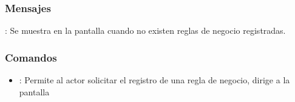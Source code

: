 \subsubsection{Mensajes}

\begin{Citemize}
	\item {}: Se muestra en la pantalla  cuando no existen reglas de negocio registradas.
\end{Citemize}

\label{IU9A}
\subsubsection{Comandos}
\begin{itemize}
	\item {}: Permite al actor solicitar el registro de una regla de negocio, dirige a la pantalla 
\end{itemize}

